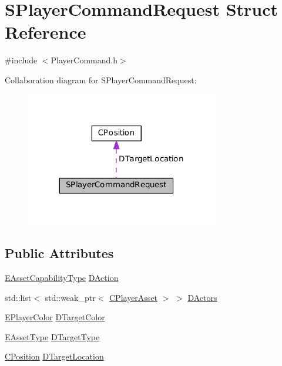 \hypertarget{structSPlayerCommandRequest}{}\section{S\+Player\+Command\+Request Struct Reference}
\label{structSPlayerCommandRequest}


{\ttfamily \#include $<$Player\+Command.\+h$>$}



Collaboration diagram for S\+Player\+Command\+Request\+:\nopagebreak
\begin{figure}[H]
\begin{center}
\leavevmode
\includegraphics[width=239pt]{structSPlayerCommandRequest__coll__graph}
\end{center}
\end{figure}
\subsection*{Public Attributes}
\begin{DoxyCompactItemize}
\item 
\hyperlink{GameDataTypes_8h_a35b98ce26aca678b03c6f9f76e4778ce}{E\+Asset\+Capability\+Type} \hyperlink{structSPlayerCommandRequest_a80897bbccf2c4e0b148a7aa815a926c6}{D\+Action}
\item 
std\+::list$<$ std\+::weak\+\_\+ptr$<$ \hyperlink{classCPlayerAsset}{C\+Player\+Asset} $>$ $>$ \hyperlink{structSPlayerCommandRequest_aa37fc01519676345703d78b9f573894a}{D\+Actors}
\item 
\hyperlink{GameDataTypes_8h_aafb0ca75933357ff28a6d7efbdd7602f}{E\+Player\+Color} \hyperlink{structSPlayerCommandRequest_a3690a5117efe6214d92f18d672b5714f}{D\+Target\+Color}
\item 
\hyperlink{GameDataTypes_8h_a5600d4fc433b83300308921974477fec}{E\+Asset\+Type} \hyperlink{structSPlayerCommandRequest_a864e47c641127665751091876a6d3c5e}{D\+Target\+Type}
\item 
\hyperlink{classCPosition}{C\+Position} \hyperlink{structSPlayerCommandRequest_a701702b94ca2fd2738e95ef6711dd41a}{D\+Target\+Location}
\end{DoxyCompactItemize}


